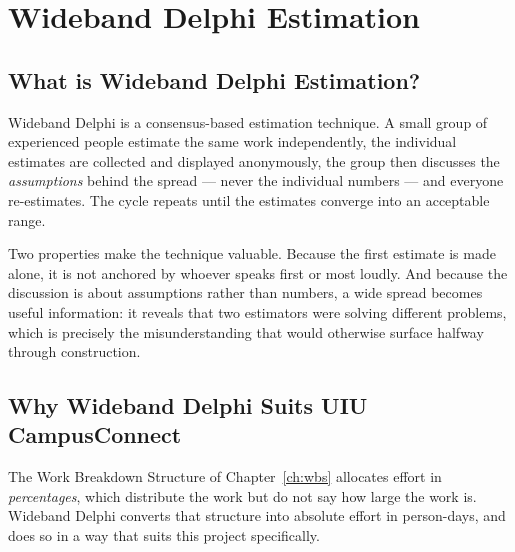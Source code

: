 \documentclass[11pt,a4paper]{report}
\begin{document}
\chapter{Wideband Delphi Estimation}
\label{ch:delphi}

\section{What is Wideband Delphi Estimation?}

Wideband Delphi is a consensus-based estimation technique. A small group of
experienced people estimate the same work independently, the individual estimates
are collected and displayed anonymously, the group then discusses the
\emph{assumptions} behind the spread --- never the individual numbers --- and
everyone re-estimates. The cycle repeats until the estimates converge into an
acceptable range.

Two properties make the technique valuable. Because the first estimate is made
alone, it is not anchored by whoever speaks first or most loudly. And because the
discussion is about assumptions rather than numbers, a wide spread becomes
useful information: it reveals that two estimators were solving different
problems, which is precisely the misunderstanding that would otherwise surface
halfway through construction.

\section{Why Wideband Delphi Suits UIU CampusConnect}

The Work Breakdown Structure of Chapter~\ref{ch:wbs} allocates effort in
\emph{percentages}, which distribute the work but do not say how large the work
is. Wideband Delphi converts that structure into absolute effort in person-days,
and does so in a way that suits this project specifically.
\end{document}

